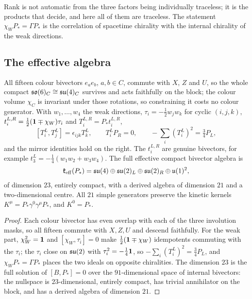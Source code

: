 Rank is not automatic from the three factors being individually traceless; it is the products that decide, and here all of them are
traceless. The statement $\chi_WP_*=\Gamma P_*$ is the correlation of spacetime chirality with the internal chirality of the weak
directions.

\subsection{The effective algebra}

\begin{theorem}
\label{thm:PSalg}
All fifteen colour bivectors $e_ae_b$, $a,b\in C$, commute with $X$, $Z$ and $U$, so the whole compact $\mathfrak{so}(6)_C\cong\mathfrak{su}(4)_C$ survives
and acts faithfully on the block; the colour volume $\chi_C$ is invariant under those rotations, so constraining it costs no colour
generator. With $w_1,\dots,w_4$ the weak directions, $\tau_i=-\tfrac12w_jw_k$ for cyclic $(i,j,k)$, $t^{L,R}_i=\tfrac12(\mathbf 1\mp\chi_W)\tau_i$
and $T^{L,R}_i=P_*t^{L,R}_i$,
\[
[T^L_i,T^L_j]=\epsilon_{ijk}T^L_k,\qquad T^L_iP_R=0,\qquad -\sum_i(T^L_i)^2=\tfrac34P_L,
\]
and the mirror identities hold on the right. The $t^{L,R}_i$ are genuine bivectors, for example $t^L_3=-\tfrac14(w_1w_2+w_3w_4)$.
The full effective compact bivector algebra is
\[
\mathfrak k_{\rm eff}(P_*)=\mathfrak{su}(4)\oplus\mathfrak{su}(2)_L\oplus\mathfrak{su}(2)_R\oplus\mathfrak{u}(1)^2,
\]
of dimension $23$, entirely compact, with a derived algebra of dimension $21$ and a two-dimensional centre. All $21$ simple generators
preserve the kinetic kernels $K^\mu=P_*\gamma^0\gamma^\mu P_*$, and $K^0=P_*$.
\end{theorem}

\begin{proof}
Each colour bivector has even overlap with each of the three involution masks, so all fifteen commute with $X,Z,U$ and descend
faithfully. For the weak part, $\chi_W^2=\mathbf 1$ and $[\chi_W,\tau_i]=0$ make $\tfrac12(\mathbf 1\mp\chi_W)$ idempotents commuting with the
$\tau_i$; the $\tau_i$ close on $\mathfrak{su}(2)$ with $\tau_i^2=-\tfrac14\mathbf 1$, so $-\sum_i(T^L_i)^2=\tfrac34P_L$, and $\chi_WP_*=\Gamma P_*$ places the
two ideals on opposite chiralities. The dimension $23$ is the full solution of $[B,P_*]=0$ over the $91$-dimensional space of internal
bivectors: the nullspace is $23$-dimensional, entirely compact, has trivial annihilator on the block, and has a derived algebra of
dimension $21$.
\end{proof}

